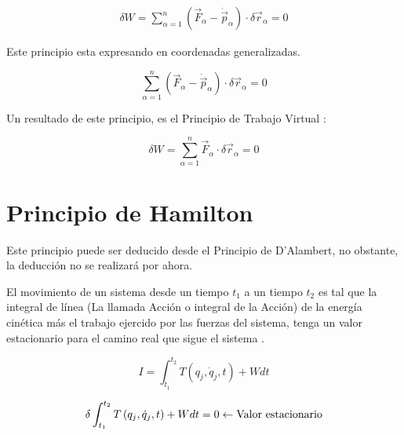 \documentclass[/home/hernan-barquero/Documents/Apuntes_mecanica_teorica/main.tex]{subfiles}
\begin{document}
    \begin{align*}
        \delta W = \sum_{\alpha=1}^{n} \left( \vec{F}_{\alpha} - \dot{\vec{p}}_{\alpha} \right) \cdot \delta \vec{r}_{\alpha} = 0
    \end{align*}

    \begin{definition} 
        Este principio esta expresando en coordenadas generalizadas.

        \begin{equation}
            \sum_{\alpha=1}^{n} \left( \vec{F}_{\alpha} - \dot{\vec{p}}_{\alpha}\right) \cdot \delta \vec{r}_{\alpha} = 0
            \label{eq: DAlambertP}
        \end{equation}
        
    \end{definition}

    Un resultado de este principio, es el Principio de Trabajo Virtual :

        \begin{equation*}
            \delta W = \sum_{\alpha=1}^{n} \vec{F}_{\alpha}  \cdot \delta \vec{r}_{\alpha} = 0
        \end{equation*}



    \section{Principio de Hamilton}

    Este principio puede ser deducido desde el Principio de D'Alambert, no obstante, la deducción no se realizará por ahora.

    \begin{definition}
        El movimiento de un sistema desde un tiempo $t_1$ a un tiempo $t_2$ es tal que la integral de línea (La llamada Acción o integral de la Acción) de la energía cinética más el trabajo ejercido por las fuerzas del sistema, tenga un valor estacionario para el camino real que sigue el sistema .

        \begin{equation}
            I = \int_{t_1}^{t_2} T\left(q_{j}, \dot{q}_{j}, t\right) + W dt 
            \label{eq: PHamiltonE}
        \end{equation}

        \begin{equation*}
            \delta \int_{t_1}^{t_2} T\left(q_{j}, \dot{q}_{j}, t\right) + W dt = 0 \leftarrow \textup{Valor estacionario}
        \end{equation*}

    \end{definition}
\end{document}
